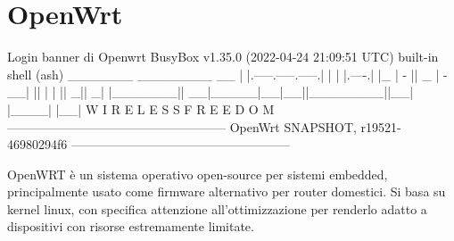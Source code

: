 \section{OpenWrt}

\begin{bashcode}{Login banner di Openwrt}{}
BusyBox v1.35.0 (2022-04-24 21:09:51 UTC) built-in shell (ash)
_______                     ________        __
|       |.-----.-----.-----.|  |  |  |.----.|  |_
|   -   ||  _  |  -__|     ||  |  |  ||   _||   _|
|_______||   __|_____|__|__||________||__|  |____|
|__| W I R E L E S S   F R E E D O M
-----------------------------------------------------
OpenWrt SNAPSHOT, r19521-46980294f6
-----------------------------------------------------
\end{bashcode}

OpenWRT è un sistema operativo open-source per sistemi embedded, principalmente usato come firmware alternativo per router domestici. Si basa su kernel linux, con specifica attenzione all'ottimizzazione per renderlo adatto a dispositivi con risorse estremamente limitate.

